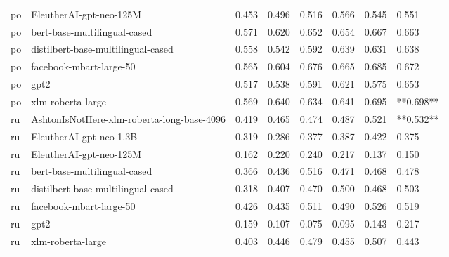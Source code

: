\begin{tabular}{llllllll}
      po &                    EleutherAI-gpt-neo-125M & 0.453 &                     0.496 &                 0.516 &                  0.566 &                                   0.545 &     0.551 \\
      po &               bert-base-multilingual-cased & 0.571 &                     0.620 &                 0.652 &                  0.654 &                                   0.667 &     0.663 \\
      po &         distilbert-base-multilingual-cased & 0.558 &                     0.542 &                 0.592 &                  0.639 &                                   0.631 &     0.638 \\
      po &                    facebook-mbart-large-50 & 0.565 &                     0.604 &                 0.676 &                  0.665 &                                   0.685 &     0.672 \\
      po &                                       gpt2 & 0.517 &                     0.538 &                 0.591 &                  0.621 &                                   0.575 &     0.653 \\
      po &                          xlm-roberta-large & 0.569 &                     0.640 &                 0.634 &                  0.641 &                                   0.695 & **0.698** \\
      ru & AshtonIsNotHere-xlm-roberta-long-base-4096 & 0.419 &                     0.465 &                 0.474 &                  0.487 &                                   0.521 & **0.532** \\
      ru &                    EleutherAI-gpt-neo-1.3B & 0.319 &                     0.286 &                 0.377 &                  0.387 &                                   0.422 &     0.375 \\
      ru &                    EleutherAI-gpt-neo-125M & 0.162 &                     0.220 &                 0.240 &                  0.217 &                                   0.137 &     0.150 \\
      ru &               bert-base-multilingual-cased & 0.366 &                     0.436 &                 0.516 &                  0.471 &                                   0.468 &     0.478 \\
      ru &         distilbert-base-multilingual-cased & 0.318 &                     0.407 &                 0.470 &                  0.500 &                                   0.468 &     0.503 \\
      ru &                    facebook-mbart-large-50 & 0.426 &                     0.435 &                 0.511 &                  0.490 &                                   0.526 &     0.519 \\
      ru &                                       gpt2 & 0.159 &                     0.107 &                 0.075 &                  0.095 &                                   0.143 &     0.217 \\
      ru &                          xlm-roberta-large & 0.403 &                     0.446 &                 0.479 &                  0.455 &                                   0.507 &     0.443 \\
\bottomrule
\end{tabular}
